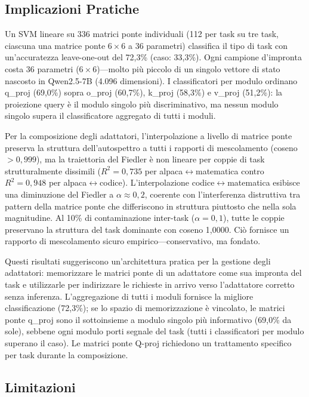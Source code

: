 \documentclass[11pt]{article}
\begin{document}
\subsection{Implicazioni Pratiche}

Un SVM lineare su 336 matrici ponte individuali (112 per task su tre
task, ciascuna una matrice ponte $6 \times 6$ a 36 parametri)
classifica il tipo di task con un'accuratezza leave-one-out del
72,3\% (caso: 33,3\%). Ogni campione d'impronta costa 36 parametri
($6 \times 6$)---molto pi\`u piccolo di un singolo vettore di stato
nascosto in Qwen2.5-7B (4.096 dimensioni). I classificatori per
modulo ordinano q\_proj (69,0\%) sopra o\_proj (60,7\%), k\_proj
(58,3\%) e v\_proj (51,2\%): la proiezione query \`e il modulo singolo
pi\`u discriminativo, ma nessun modulo singolo supera il
classificatore aggregato di tutti i moduli.

Per la composizione degli adattatori, l'interpolazione a livello di
matrice ponte preserva la struttura dell'autospettro a tutti i rapporti
di mescolamento (coseno $> 0{,}999$), ma la traiettoria del Fiedler \`e
non lineare per coppie di task strutturalmente dissimili
($R^2 = 0{,}735$ per alpaca$\leftrightarrow$matematica contro
$R^2 = 0{,}948$ per alpaca$\leftrightarrow$codice).
L'interpolazione codice$\leftrightarrow$matematica esibisce una
diminuzione del Fiedler a $\alpha \approx 0{,}2$, coerente con
l'interferenza distruttiva tra pattern della matrice ponte che
differiscono in struttura piuttosto che nella sola magnitudine. Al 10\%
di contaminazione inter-task ($\alpha = 0{,}1$), tutte le coppie
preservano la struttura del task dominante con coseno 1,0000. Ci\`o
fornisce un rapporto di mescolamento sicuro empirico---conservativo, ma
fondato.

Questi risultati suggeriscono un'architettura pratica per la gestione
degli adattatori: memorizzare le matrici ponte di un adattatore come
sua impronta del task e utilizzarle per indirizzare le richieste in
arrivo verso l'adattatore corretto senza inferenza. L'aggregazione di
tutti i moduli fornisce la migliore classificazione (72,3\%); se lo
spazio di memorizzazione \`e vincolato, le matrici ponte q\_proj sono
il sottoinsieme a modulo singolo pi\`u informativo (69,0\% da sole),
sebbene ogni modulo porti segnale del task (tutti i classificatori per
modulo superano il caso). Le matrici ponte
Q-proj richiedono un trattamento specifico per task durante la
composizione.

\subsection{Limitazioni}
\label{sec:limitations}
\end{document}
